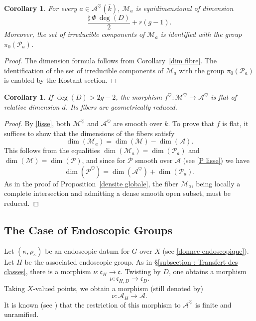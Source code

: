 \documentclass[12pt,english]{smfart}
\numberwithin{equation}{subsection}
\newtheorem{corollary}[equation]{Corollary}
\theoremstyle{remark}
\begin{document}
\begin{corollary}
For every $a\in\mathcal{A}^\heartsuit(\bar{k})$, $\mathcal{M}_a$ is equidimensional of dimension
$$
\frac{\sharp\,\Phi\,\deg(D)}{2}+r(g-1).
$$
Moreover, the set of irreducible components of $\mathcal{M}_a$ is identified with the group $\pi_0(\mathcal{P}_a)$.
\end{corollary}

\begin{proof}
The dimension formula follows from Corollary~\ref{dim fibre}. The identification of the set of irreducible components of $\mathcal{M}_a$
with the group $\pi_0(\mathcal{P}_a)$ is enabled by the Kostant section.
\end{proof}

\begin{corollary}
If $\deg(D)>2g-2$, the morphism $f^\heartsuit:\mathcal{M}^\heartsuit\rightarrow \mathcal{A}^\heartsuit$ is flat of relative dimension $d$.
Its fibers are geometrically reduced.
\end{corollary}

\begin{proof}
By \ref{lisse}, both $\mathcal{M}^\heartsuit$ and $\mathcal{A}^\heartsuit$ are smooth over $k$.
To prove that $f$ is flat, it suffices to show that the dimensions of the fibers satisfy
$$
\dim(\mathcal{M}_a)=\dim(\mathcal{M})-\dim(\mathcal{A}).
$$
This follows from the equalities $\dim(\mathcal{M}_a)=\dim(\mathcal{P}_a)$ and $\dim(\mathcal{M})=\dim(\mathcal{P})$,
and since for $\mathcal{P}$ smooth over $\mathcal{A}$ (see \ref{P lisse}) we have
$$
\dim(\mathcal{P}^\heartsuit)=\dim(\mathcal{A}^\heartsuit)+\dim(\mathcal{P}_a).
$$
As in the proof of Proposition~\ref{densite globale}, the fiber $\mathcal{M}_a$, being locally a complete intersection and admitting a dense smooth open subset,
must be reduced.
\end{proof}

\subsection{The Case of Endoscopic Groups}\label{subsection : Fibration de Hitchin de groupes endoscopiques}

Let $(\kappa,\rho_\kappa)$ be an endoscopic datum for $G$ over $X$ (see \ref{donnee endoscopique}).
Let $H$ be the associated endoscopic group. As in \S\ref{subsection : Transfert des classes},
there is a morphism $\nu:\mathfrak{c}_H\rightarrow \mathfrak{c}$. Twisting by $D$, one obtains a morphism
$$
\nu:\mathfrak{c}_{H,D}\rightarrow \mathfrak{c}_D.
$$
Taking $X$-valued points, we obtain a morphism (still denoted by)
$$
\nu:\mathcal{A}_H\rightarrow \mathcal{A}.
$$
It is known (see \cite[7.2]{N}) that the restriction of this morphism to $\mathcal{A}^\heartsuit$ is finite and unramified.
\end{document}
